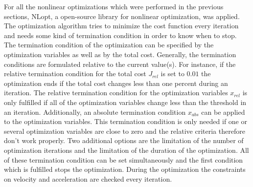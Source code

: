 For all the nonlinear optimizations which were performed in the previous sections, NLopt, a open-source library for nonlinear optimization, was applied. The optimization algorithm tries to minimize the cost function every iteration and needs some kind of termination condition in order to know when to stop.\newline
The termination condition of the optimization can be specified by the optimization variables as well as by the total cost. Generally, the termination conditions are formulated relative to the current value(s). For instance, if the relative termination condition for the total cost $J_{rel}$ is set to $0.01$ the optimization ends if the total cost changes less than one percent during an iteration. The relative termination condition for the optimization variables $x_{rel}$ is only fulfilled if all of the optimization variables change less than the threshold in an iteration.
Additionally, an absolute termination condition $x_{abs}$ can be applied to the optimization variables. This termination condition is only needed if one or several optimization variables are close to zero and the relative criteria therefore don't work properly. \newline 
Two additional options are the limitation of the number of optimization iterations and the limitation of the duration of the optimization. All of these termination condition can be set simultaneously and the first condition which is fulfilled stops the optimization.
During the optimization the constraints on velocity and acceleration are checked every iteration. \newline










%




%
%
%
%
%





